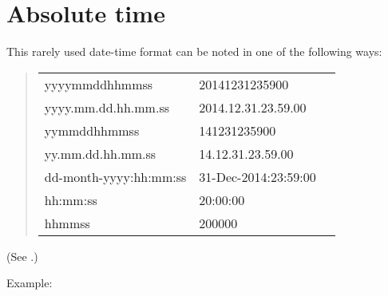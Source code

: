 \documentclass[letterpaper,10pt,english]{sphinxmanual}
\begin{document}
\section{Absolute time}
\label{\detokenize{basic/date_format:abstime}}\label{\detokenize{basic/date_format:absolute-time}}
This rarely used date-time format can be noted in one of the
following ways:
\begin{quote}


\begin{savenotes}\sphinxattablestart
\centering
\begin{tabulary}{\linewidth}[t]{|T|T|T|}
\hline
{}\relax &\relax &\relax \\
\hline
yyyymmddhhmmss
&
20141231235900
&%
\\
yyyy.mm.dd.hh.mm.ss
&
2014.12.31.23.59.00
&\\
yymmddhhmmss
&
141231235900
&\\
yy.mm.dd.hh.mm.ss
&
14.12.31.23.59.00
&\\
dd-month-yyyy:hh:mm:ss
&
31-Dec-2014:23:59:00
&\\
\hline
hh:mm:ss
&
20:00:00
&%
\\
hhmmss
&
200000
&\\
\hline
\end{tabulary}
\par
\sphinxattableend\end{savenotes}
\end{quote}

(See {\hyperref[\detokenize{basic/date_format:abbreviation}]{}}.)

Example:
\end{document}
